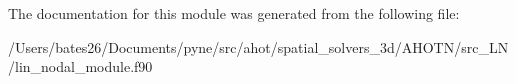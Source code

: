 The documentation for this module was generated from the following file\+:\begin{DoxyCompactItemize}
\item 
/\+Users/bates26/\+Documents/pyne/src/ahot/spatial\+\_\+solvers\+\_\+3d/\+A\+H\+O\+T\+N/src\+\_\+\+L\+N/lin\+\_\+nodal\+\_\+module.\+f90\end{DoxyCompactItemize}
